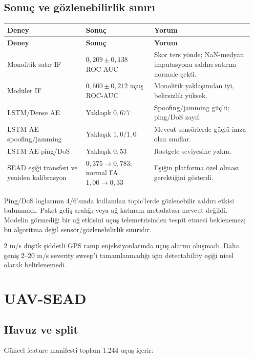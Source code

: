 \documentclass[11pt,a4paper,oneside]{report}
\begin{document}
\subsection{Sonuç ve gözlenebilirlik sınırı}

\begin{longtable}{L{0.36\textwidth}L{0.23\textwidth}L{0.32\textwidth}}
\toprule
\textbf{Deney} & \textbf{Sonuç} & \textbf{Yorum}\\
\midrule
\endfirsthead
\toprule
\textbf{Deney} & \textbf{Sonuç} & \textbf{Yorum}\\
\midrule
\endhead
Monolitik satır IF & \(0{,}209\pm0{,}138\) ROC-AUC & Skor ters yönde; NaN-medyan imputasyonu saldırı satırını normale çekti.\\
Modüler IF & \(0{,}600\pm0{,}212\) uçuş ROC-AUC & Monolitik yaklaşımdan iyi, belirsizlik yüksek.\\
LSTM/Dense AE & Yaklaşık \(0{,}677\) & Spoofing/jamming güçlü; ping/DoS zayıf.\\
LSTM-AE spoofing/jamming & Yaklaşık \(1{,}0/1{,}0\) & Mevcut sensörlerde güçlü imza olan sınıflar.\\
LSTM-AE ping/DoS & Yaklaşık \(0{,}53\) & Rastgele seviyesine yakın.\\
SEAD eşiği transferi ve yeniden kalibrasyon & \(0{,}375\to0{,}783\); normal FA \(1{,}00\to0{,}33\) & Eşiğin platforma özel olması gerektiğini gösterdi.\\
\bottomrule
\end{longtable}

Ping/DoS loglarının 4/6'sında kullanılan topic'lerde gözlenebilir saldırı
etkisi bulunmadı. Paket geliş aralığı veya ağ katmanı metadatası mevcut
değildi. Modelin görmediği bir ağ etkisini uçuş telemetrisinden tespit etmesi
beklenemez; bu algoritma değil sensör/gözlenebilirlik sınırıdır.

2 m/s düşük şiddetli GPS ramp enjeksiyonlarında uçuş alarmı oluşmadı. Daha
geniş 2--20 m/s severity sweep'i tamamlanmadığı için detectability eşiği
nicel olarak belirlenemedi.

\section{UAV-SEAD}

\subsection{Havuz ve split}

Güncel feature manifesti toplam 1.244 uçuş içerir:
\end{document}

